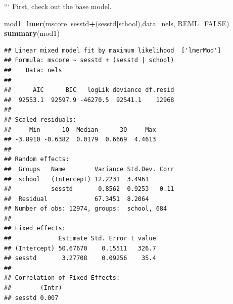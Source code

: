 \documentclass[ignorenonframetext,]{beamer}
\newenvironment{Shaded}{\begin{snugshade}}{\end{snugshade}}
\newcommand{\KeywordTok}[1]{\textcolor[rgb]{0.13,0.29,0.53}{\textbf{#1}}}
\newcommand{\DataTypeTok}[1]{\textcolor[rgb]{0.13,0.29,0.53}{#1}}
\newcommand{\OtherTok}[1]{\textcolor[rgb]{0.56,0.35,0.01}{#1}}
\newcommand{\OperatorTok}[1]{\textcolor[rgb]{0.81,0.36,0.00}{\textbf{#1}}}
\newcommand{\NormalTok}[1]{#1}
\begin{document}
\begin{frame}[fragile]{}

``` First, check out the base model.

\begin{Shaded}
\begin{Highlighting}[]
\NormalTok{mod1=}\KeywordTok{lmer}\NormalTok{(mscore}\OperatorTok{~}\NormalTok{sesstd}\OperatorTok{+}\NormalTok{(sesstd}\OperatorTok{|}\NormalTok{school),}\DataTypeTok{data=}\NormalTok{nels, }\DataTypeTok{REML=}\OtherTok{FALSE}\NormalTok{)}
\KeywordTok{summary}\NormalTok{(mod1)}
\end{Highlighting}
\end{Shaded}

\begin{verbatim}
## Linear mixed model fit by maximum likelihood  ['lmerMod']
## Formula: mscore ~ sesstd + (sesstd | school)
##    Data: nels
## 
##      AIC      BIC   logLik deviance df.resid 
##  92553.1  92597.9 -46270.5  92541.1    12968 
## 
## Scaled residuals: 
##     Min      1Q  Median      3Q     Max 
## -3.8910 -0.6382  0.0179  0.6669  4.4613 
## 
## Random effects:
##  Groups   Name        Variance Std.Dev. Corr
##  school   (Intercept) 12.2231  3.4961       
##           sesstd       0.8562  0.9253   0.11
##  Residual             67.3451  8.2064       
## Number of obs: 12974, groups:  school, 684
## 
## Fixed effects:
##             Estimate Std. Error t value
## (Intercept) 50.67670    0.15511   326.7
## sesstd       3.27708    0.09256    35.4
## 
## Correlation of Fixed Effects:
##        (Intr)
## sesstd 0.007
\end{verbatim}

\end{frame}
\end{document}
